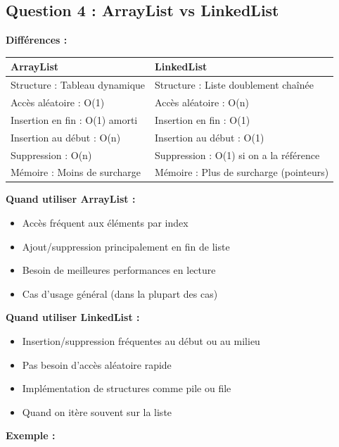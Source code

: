 \documentclass[11pt,a4paper]{article}
\begin{document}
\subsection{Question 4 : ArrayList vs LinkedList}

\begin{correctionbox}
\textbf{Différences :}

\begin{table}[h]
\centering
\begin{tabular}{|p{6cm}|p{6cm}|}
\hline
\textbf{ArrayList} & \textbf{LinkedList} \\
\hline
Structure : Tableau dynamique & Structure : Liste doublement chaînée \\
\hline
Accès aléatoire : O(1) & Accès aléatoire : O(n) \\
\hline
Insertion en fin : O(1) amorti & Insertion en fin : O(1) \\
\hline
Insertion au début : O(n) & Insertion au début : O(1) \\
\hline
Suppression : O(n) & Suppression : O(1) si on a la référence \\
\hline
Mémoire : Moins de surcharge & Mémoire : Plus de surcharge (pointeurs) \\
\hline
\end{tabular}
\end{table}

\textbf{Quand utiliser ArrayList :}
\begin{itemize}
    \item Accès fréquent aux éléments par index
    \item Ajout/suppression principalement en fin de liste
    \item Besoin de meilleures performances en lecture
    \item Cas d'usage général (dans la plupart des cas)
\end{itemize}

\textbf{Quand utiliser LinkedList :}
\begin{itemize}
    \item Insertion/suppression fréquentes au début ou au milieu
    \item Pas besoin d'accès aléatoire rapide
    \item Implémentation de structures comme pile ou file
    \item Quand on itère souvent sur la liste
\end{itemize}

\textbf{Exemple :}


\end{correctionbox}
\end{document}
